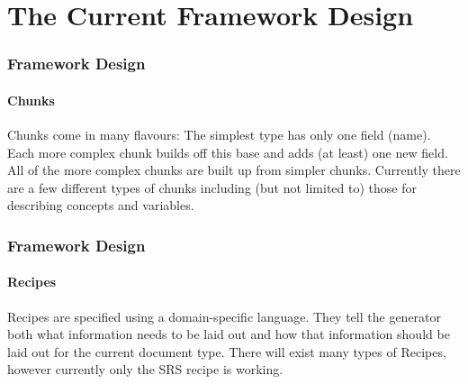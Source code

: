 \documentclass{beamer}
\begin{document}

\section[The Design]{The Current Framework Design}


\begin{frame}

\frametitle{Framework Design}

\framesubtitle{Chunks}

Chunks come in many flavours:
The simplest type has only one field (name). Each more complex chunk builds off
this base and adds (at least) one new field. 
\newline \newline
All of the more complex chunks are built up from simpler chunks. 
\newline \newline
Currently there are a few different types of chunks including (but not limited
to) those for describing concepts and variables.

\end{frame}


\begin{frame}

\frametitle{Framework Design}

\framesubtitle{Recipes}

Recipes are specified using a domain-specific language.
\newline \newline
They tell the generator both what information needs to be laid out
and how that information should be laid out for the current document type.
\newline \newline
There will exist many types of Recipes, however currently only the SRS recipe
is working.

\end{frame}

\end{document}

